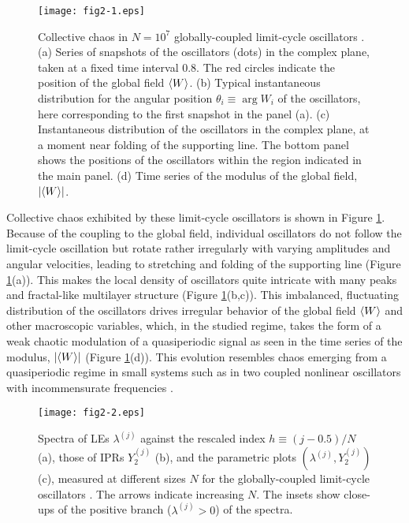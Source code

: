 \documentclass[12pt]{iopart}
\begin{document}
\begin{figure}[t]
 \begin{center}
  \texttt{[image: fig2-1.eps]}
  \caption{Collective chaos in $N=10^7$ globally-coupled limit-cycle oscillators . (a) Series of snapshots of the oscillators (dots) in the complex plane, taken at a fixed time interval $0.8$. The red circles indicate the position of the global field $\langle W \rangle$. (b) Typical instantaneous distribution for the angular position $\theta_i \equiv \arg W_i$ of the oscillators, here corresponding to the first snapshot in the panel (a). (c) Instantaneous distribution of the oscillators in the complex plane, at a moment near folding of the supporting line. The bottom panel shows the positions of the oscillators within the region indicated in the main panel. (d) Time series of the modulus of the global field, $|\langle W \rangle|$.}
  \label{fig:2-1}
 \end{center}
\end{figure}%

Collective chaos exhibited by these limit-cycle oscillators is shown
 in Figure \ref{fig:2-1}.
Because of the coupling to the global field,
 individual oscillators do not follow the limit-cycle oscillation
 but rotate rather irregularly with varying amplitudes and angular velocities,
 leading to stretching and folding of the supporting line
 (Figure \ref{fig:2-1}(a)).
This makes the local density of oscillators quite intricate
 with many peaks and fractal-like multilayer structure
 (Figure \ref{fig:2-1}(b,c)).
This imbalanced, fluctuating distribution of the oscillators
 drives irregular behavior of the global field $\langle W \rangle$
 and other macroscopic variables,
 which, in the studied regime,
 takes the form of a weak chaotic modulation of a quasiperiodic signal
 as seen in the time series of the modulus, $|\langle W \rangle|$
 (Figure \ref{fig:2-1}(d)).
This evolution resembles chaos emerging from a quasiperiodic regime in small systems
such as in two coupled nonlinear oscillators
 with incommensurate frequencies \cite{Sano.Sawada-PLA1983}.

\begin{figure}[t]
 \begin{center}
  \texttt{[image: fig2-2.eps]}
  \caption{Spectra of LEs $\lambda^{(j)}$ against the rescaled index $h \equiv (j-0.5)/N$ (a), those of IPRs $Y_2^{(j)}$ (b), and the parametric plots $(\lambda^{(j)},Y_2^{(j)})$ (c), measured at different sizes $N$ for the globally-coupled limit-cycle oscillators . The arrows indicate increasing $N$. The insets show close-ups of the positive branch ($\lambda^{(j)} > 0$) of the spectra.}
  \label{fig:2-2}
 \end{center}
\end{figure}%
\end{document}
